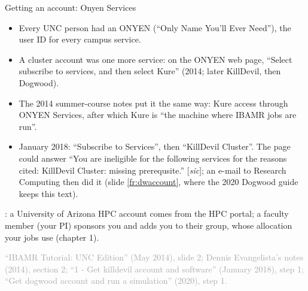 \documentclass[aspectratio=169,11pt]{beamer}
\newcommand{\sourcecredit}[1]{\vfill\begin{flushright}\tiny\textcolor{DarkGray}{#1}\end{flushright}}
\begin{document}
\begin{frame}{Getting an account: Onyen Services}
\label{fr:onyen}
\footnotesize
\begin{itemize}\setlength{\itemsep}{2pt}
  \item Every UNC person had an ONYEN (``Only Name You'll Ever Need''), the user ID for every campus service.
  \item A cluster account was one more service: on the ONYEN web page, ``Select subscribe to services, and then select Kure'' (2014; later KillDevil, then Dogwood).
  \item The 2014 summer-course notes put it the same way: Kure access through ONYEN Services, after which Kure is ``the machine where IBAMR jobs are run''.
  \item January 2018: ``Subscribe to Services'', then ``KillDevil Cluster''. The page could answer ``You are ineligible for the following services for the reasons cited: KillDevil Cluster: missing  prerequsite.'' [\emph{sic}]; an e-mail to Research Computing then did it (slide \ref{fr:dwaccount}, where the 2020 Dogwood guide keeps this text).
\end{itemize}
\vspace{2mm}
\begin{punchbox}
\footnotesize {}: a University of Arizona HPC account comes from the HPC portal; a faculty member (your PI) sponsors you and adds you to their group, whose allocation your jobs use (chapter 1).
\end{punchbox}
\sourcecredit{``IBAMR Tutorial: UNC Edition'' (May 2014), slide 2; Dennis Evangelista's notes (2014), section 2; ``1 - Get killdevil account and software'' (January 2018), step 1; ``Get dogwood account and run a simulation'' (2020), step 1.}
\end{frame}
\end{document}

